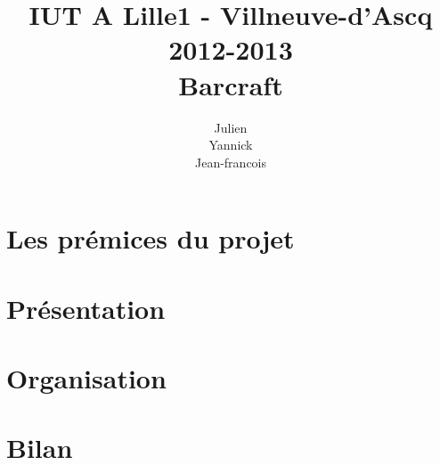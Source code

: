 \documentclass[12pt,a4paper]{report}
\title
{
	\normalsize{IUT A Lille1 - Villneuve-d'Ascq\\
	2012-2013}\\
	\vspace{15mm}
  \Huge{Barcraft
    \vspace{15mm}}
}
\author{
\bsc{Stechele} Julien\\
\bsc{Vanuxem} Yannick\\
\bsc{Serir} Jean-francois\\
	\vspace{30mm}
}
\begin{document}

\maketitle

%

\renewcommand{\contentsname}{Sommaire}


\section{Les prémices du projet}%
\label{sec:les_premices_du_projet}

  


\section{Présentation}%
\label{sec:presentation}

  


\section{Organisation}%
\label{sec:organisation}

  


\section{Bilan}%
\label{sec:bilan}

  


\appendix

\end{document}
